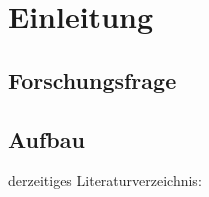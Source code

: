 \section{Einleitung}
\label{section:Introduction}


\subsection{Forschungsfrage}
\label{subsection:Coding}


\subsection{Aufbau}
derzeitiges Literaturverzeichnis:\newline
\autocite[]{Bracey.2014}\newline
\autocite[]{Coyier.2012}\newline
\autocite[]{Croom.2012}\newline
\autocite[]{Firdaus.}\newline
\autocite[]{Hixon.2011}\newline
\autocite[]{Page.2013}\newline
\autocite[]{ZingDesign.2014}\newline
\newpage
